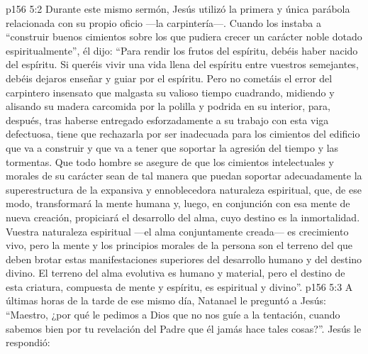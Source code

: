 \vs p156 5:2 Durante este mismo sermón, Jesús utilizó la primera y única parábola relacionada con su propio oficio ---la carpintería---. Cuando los instaba a “construir buenos cimientos sobre los que pudiera crecer un carácter noble dotado espiritualmente”, él dijo: “Para rendir los frutos del espíritu, debéis haber nacido del espíritu. Si queréis vivir una vida llena del espíritu entre vuestros semejantes, debéis dejaros enseñar y guiar por el espíritu. Pero no cometáis el error del carpintero insensato que malgasta su valioso tiempo cuadrando, midiendo y alisando su madera carcomida por la polilla y podrida en su interior, para, después, tras haberse entregado esforzadamente a su trabajo con esta viga defectuosa, tiene que rechazarla por ser inadecuada para los cimientos del edificio que va a construir y que va a tener que soportar la agresión del tiempo y las tormentas. Que todo hombre se asegure de que los cimientos intelectuales y morales de su carácter sean de tal manera que puedan soportar adecuadamente la superestructura de la expansiva y ennoblecedora naturaleza espiritual, que, de ese modo, transformará la mente humana y, luego, en conjunción con esa mente de nueva creación, propiciará el desarrollo del alma, cuyo destino es la inmortalidad. Vuestra naturaleza espiritual ---el alma conjuntamente creada--- es crecimiento vivo, pero la mente y los principios morales de la persona son el terreno del que deben brotar estas manifestaciones superiores del desarrollo humano y del destino divino. El terreno del alma evolutiva es humano y material, pero el destino de esta criatura, compuesta de mente y espíritu, es espiritual y divino”.
\vs p156 5:3 A últimas horas de la tarde de ese mismo día, Natanael le preguntó a Jesús: “Maestro, ¿por qué le pedimos a Dios que no nos guíe a la tentación, cuando sabemos bien por tu revelación del Padre que él jamás hace tales cosas?”. Jesús le respondió:
